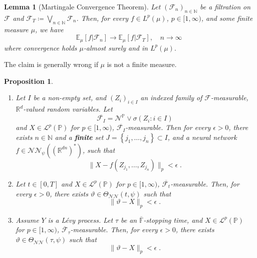 \documentclass[11pt]{report}
\theoremstyle{plain} %
\newtheorem{proposition}[proposition]{Proposition}
\newtheorem{lemma}[lemma]{Lemma}
\theoremstyle{definition} %
\theoremstyle{remark} %
\begin{document}
\begin{lemma}[Martingale Convergence Theorem]\label{lemma:Martingale Convergence Theorem}
    Let \((\mathcal{F}_n)_{n\in\mathbb{N}}\) be a filtration on \(\mathcal{F}\) and \(\mathcal{F}_{T}\coloneqq\bigvee_{n\in\mathbb{N}}\mathcal{F}_n\). Then, for every \(f\in L^p(\mu)\), \(p\in[1,\infty)\), and some finite measure \(\mu\), we have
    \begin{equation}
        \mathbb{E}_{\mu}[f|\mathcal{F}_n]\to\mathbb{E}_{\mu}[f|\mathcal{F}_{T}],\quad n\to\infty
    \end{equation}
 where convergence holds \(\mu\)-almost surely and in \(L^p(\mu)\).
\end{lemma}
The claim is generally wrong if \(\mu\) is not a finite measure.
\begin{proposition}\label{prop:approximation of measurable maps by algorithmic strategies}
\begin{enumerate}
    \item Let \(I\) be a non-empty set, and \((Z_i)_{i\in I}\) an indexed family of \(\mathcal{F}\)-measurable, \(\mathbb{R}^d\)-valued random variables. Let 
    \begin{equation}
        \overline{\mathcal{F}_I}=\mathcal{N}^\mathbb{P}\vee\sigma(Z_i:i\in I)
    \end{equation}
    and \(X\in\mathcal{L}^p(\mathbb{P})\) for \(p\in[1,\infty)\), \(\overline{\mathcal{F}_I}\)-measurable. Then for every \(\epsilon>0\), there exists \(n\in\mathbb{N}\) and a \textbf{finite} set \(J=\left\{j_1,\dots,j_n\right\}\subset I\), and a neural network \(f\in\mathcal{NN}_\psi((\mathbb{R}^{dn})^*)\), such that 
    \begin{equation}
        \lVert X-f(Z_{j_1},\dots, Z_{j_n})\rVert_{p}<\epsilon\;.
    \end{equation}
    \item Let \(t\in[0,T]\) and \(X\in\mathcal{L}^p(\mathbb{P})\) for \(p\in[1,\infty)\), \(\overline{\mathcal{F}_t}\)-measurable. Then, for every \(\epsilon>0\), there exists \(\vartheta\in\Theta_{\mathcal{NN}}(t,\psi)\) such that 
    \begin{equation}
        \lVert \vartheta-X\rVert_{p}<\epsilon\;.
    \end{equation}
    \item Assume \(Y\) is a Lévy process. Let \(\tau\) be an \(\overline{\mathbb{F}}\)-stopping time, and \(X\in\mathcal{L}^p(\mathbb{P})\) for \(p\in[1,\infty)\), \(\overline{\mathcal{F}}_{\tau}\)-measurable. Then, for every \(\epsilon>0\), there exists \(\vartheta\in\Theta_{\mathcal{NN}}(\tau,\psi)\) such that 
    \begin{equation}
        \lVert \vartheta-X\rVert_{p}<\epsilon\;.
    \end{equation}
\end{enumerate}
\end{proposition}
\end{document}
